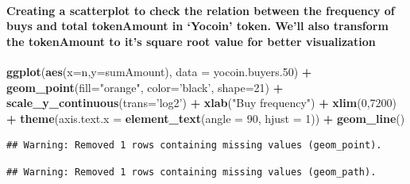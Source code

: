 \documentclass[]{article}
\newenvironment{Shaded}{\begin{snugshade}}{\end{snugshade}}
\newcommand{\KeywordTok}[1]{\textcolor[rgb]{0.13,0.29,0.53}{\textbf{#1}}}
\newcommand{\DataTypeTok}[1]{\textcolor[rgb]{0.13,0.29,0.53}{#1}}
\newcommand{\DecValTok}[1]{\textcolor[rgb]{0.00,0.00,0.81}{#1}}
\newcommand{\StringTok}[1]{\textcolor[rgb]{0.31,0.60,0.02}{#1}}
\newcommand{\OperatorTok}[1]{\textcolor[rgb]{0.81,0.36,0.00}{\textbf{#1}}}
\newcommand{\NormalTok}[1]{#1}
\let\oldparagraph\paragraph
\renewcommand{\paragraph}[1]{\oldparagraph{#1}\mbox{}}
\begin{document}
\paragraph{\texorpdfstring{Creating a scatterplot to check the relation
between the frequency of buys and total tokenAmount in `Yocoin' token.
We'll also transform the tokenAmount to it's square root value for
better
visualization}{Creating a scatterplot to check the relation between the frequency of buys and total tokenAmount in Yocoin token. We'll also transform the tokenAmount to it's square root value for better visualization}}\label{creating-a-scatterplot-to-check-the-relation-between-the-frequency-of-buys-and-total-tokenamount-in-yocoin-token.-well-also-transform-the-tokenamount-to-its-square-root-value-for-better-visualization}

\begin{Shaded}
\begin{Highlighting}[]
\KeywordTok{ggplot}\NormalTok{(}\KeywordTok{aes}\NormalTok{(}\DataTypeTok{x=}\NormalTok{n,}\DataTypeTok{y=}\NormalTok{sumAmount), }\DataTypeTok{data =}\NormalTok{ yocoin.buyers.}\DecValTok{50}\NormalTok{) }\OperatorTok{+}\StringTok{ }
\StringTok{  }\KeywordTok{geom_point}\NormalTok{(}\DataTypeTok{fill=}\StringTok{"orange"}\NormalTok{, }\DataTypeTok{color=}\StringTok{'black'}\NormalTok{, }\DataTypeTok{shape=}\DecValTok{21}\NormalTok{) }\OperatorTok{+}
\StringTok{  }\KeywordTok{scale_y_continuous}\NormalTok{(}\DataTypeTok{trans=}\StringTok{'log2'}\NormalTok{) }\OperatorTok{+}
\StringTok{  }\KeywordTok{xlab}\NormalTok{(}\StringTok{"Buy frequency"}\NormalTok{) }\OperatorTok{+}\StringTok{ }
\StringTok{  }\KeywordTok{xlim}\NormalTok{(}\DecValTok{0}\NormalTok{,}\DecValTok{7200}\NormalTok{) }\OperatorTok{+}\StringTok{ }
\StringTok{  }\KeywordTok{theme}\NormalTok{(}\DataTypeTok{axis.text.x =} \KeywordTok{element_text}\NormalTok{(}\DataTypeTok{angle =} \DecValTok{90}\NormalTok{, }\DataTypeTok{hjust =} \DecValTok{1}\NormalTok{)) }\OperatorTok{+}
\StringTok{  }\KeywordTok{geom_line}\NormalTok{()}
\end{Highlighting}
\end{Shaded}

\begin{verbatim}
## Warning: Removed 1 rows containing missing values (geom_point).
\end{verbatim}

\begin{verbatim}
## Warning: Removed 1 rows containing missing values (geom_path).
\end{verbatim}
\end{document}
